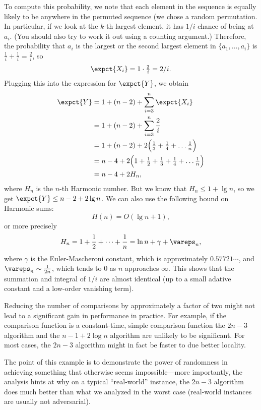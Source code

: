{To compute this probability, we note that each element in the sequence
is equally likely to be anywhere in the permuted sequence (we chose a
random permutation.  In particular, if we look at the $k$-th largest
element, it has $1/i$ chance of being at $a_i$.  (You should also try
to work it out using a counting argument.)  Therefore, the probability
that $a_i$ is the largest or the second largest element in $\{a_1,
\dots, a_i\}$ is $\frac1i + \frac1i = \frac2i$, so
\[
  \expct{X_i} = 1\cdot \tfrac2i = 2/i.
\]
Plugging this into the expression for $\expct{Y}$, we obtain
\begin{align*}
  \expct{Y} &= 1 + (n-2) + \sum_{i=3}^n \expct{X_i} \\
  &= 1 + (n-2) + \sum_{i=3}^n \frac2i \\
  &= 1 + (n-2) + 2\Big(\tfrac13 + \tfrac14 + \dots \tfrac1n\Big)\\
  &= n - 4 + 2\Big(1 + \tfrac12 + \tfrac13 + \tfrac14 + \dots \tfrac1n\Big)\\
  &= n - 4 + 2H_n,
\end{align*}
where $H_n$ is the $n$-th Harmonic number.  But we know that $H_n \leq 1 +
\lg n$, so we get $\expct{Y} \leq n - 2 + 2\lg n$.
%
We can also use the following bound on  Harmonic sums: 
\[
H(n) = O(\lg{n} + 1),
\]
or more precisely
\begin{equation*}
    H_n = 1 + \frac12 + \dots + \frac1n = \ln n + \gamma + \vareps_n,
\end{equation*}
where $\gamma$ is the Euler-Mascheroni constant, which is
approximately $0.57721\cdots$, and $\vareps_n \sim \frac1{2n}$,
 which tends to $0$ as $n$ approaches $\infty$. This shows that the
summation and integral of $1/i$ are almost identical (up to
a small adative constant and a low-order vanishing term).  
%



\begin{remark}
Reducing the number of comparisons by approximately a factor of two
might not lead to a significant gain in performance in practice.
%
For example, if the comparison function is a constant-time, simple
comparison function the $2n - 3$ algorithm and the $n - 1 + 2\log n$
algorithm are unlikely to be significant.  For most cases, the $2n -
3$ algorithm might in fact be faster to due better locality.

The point of this example is to demonstrate the power of randomness in
achieving something that otherwise seems impossible---more
importantly, the analysis hints at why on a typical ``real-world''
instance, the $2n - 3$ algorithm does much better than what we
analyzed in the worst case (real-world instances are usually not
adversarial).
\end{remark}

}
